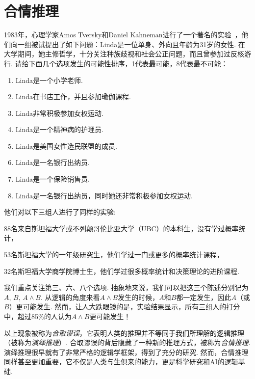 \chapter{合情推理}\label{chap:plausible-reasoning}

1983年，心理学家Amos Tversky和Daniel Kahneman进行了一个著名的实验~\cite{tverskyExtensionalIntuitiveReasoning1983}，他们向一组被试提出了如下问题：Linda是一位单身、外向且年龄为31岁的女性. 在大学期间，她主修哲学，十分关注种族歧视和社会公正问题，而且曾参加过反核游行. 请给下面几个选项发生的可能性排序，1代表最可能，8代表最不可能：
\begin{enumerate}
    \item Linda是一个小学老师.
    \item Linda在书店工作，并且参加瑜伽课程.
    \item Linda非常积极参加女权运动.
    \item Linda是一个精神病的护理员.
    \item Linda是美国女性选民联盟的成员.
    \item Linda是一名银行出纳员.
    \item Linda是一个保险销售员.
    \item Linda是一名银行出纳员，同时她还非常积极参加女权运动.
\end{enumerate}

他们对以下三组人进行了同样的实验:
\begin{enumerate*}[label=(\arabic*)]
    \item 88名来自斯坦福大学或不列颠哥伦比亚大学（UBC）的本科生，没有学过概率统计，
    \item 53名斯坦福大学的一年级研究生，他们学过一门或更多的概率统计课程，
    \item 32名斯坦福大学商学院博士生，他们学过很多概率统计和决策理论的进阶课程.
\end{enumerate*}

我们重点关注第三、六、八个选项. 抽象地来说，我们可以把这三个陈述分别记为$A$, $B$, $A\wedge B$. 从逻辑的角度来看$A\wedge B$发生的时候，$A$和$B$都一定发生，因此$A$（或$B$）更可能发生. 然而，让人大跌眼镜的是，实验结果显示，所有三组人的打分中，超过85\%的人认为$A\wedge B$更可能发生！

以上现象被称为\textit{合取谬误}，它表明人类的推理并不等同于我们所理解的逻辑推理（被称为\textit{演绎推理}）. 合取谬误的背后隐藏了一种新的推理方式，被称为\textit{合情推理}. 演绎推理很早就有了非常严格的逻辑学框架，得到了充分的研究. 然而，合情推理同样甚至更加重要，它不仅是人类与生俱来的能力，更是科学研究和AI的逻辑基础. 

